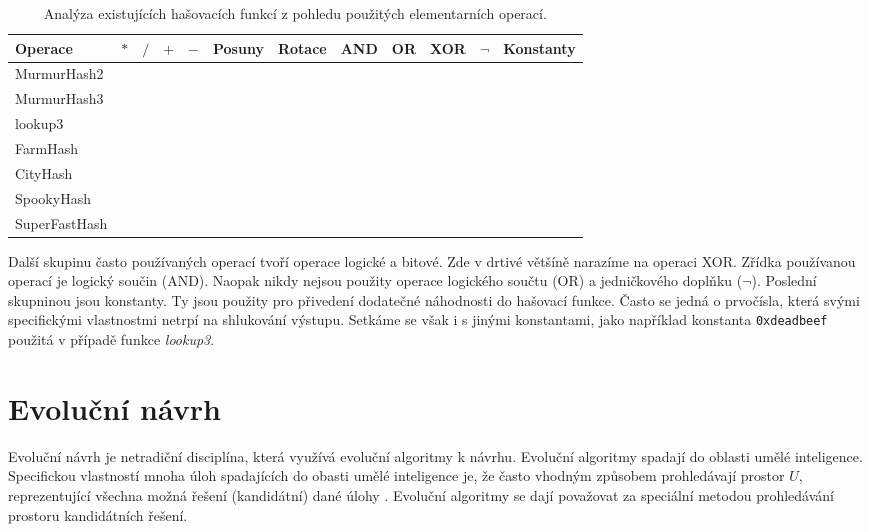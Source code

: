 \begin{table}[!ht]
	\centering
	\label{tab:generic_hashes_analysis}
	\begin{tabular}{lccccccccccc}
		\hline
		Operace            & $*$ & $/$ & $+$ & $-$ & Posuny & Rotace & AND & OR & XOR & $\neg$ & Konstanty \\
		\hline
		MurmurHash2   & \checkmark & & & & \checkmark & & & & \checkmark & & \checkmark \\
		MurmurHash3   & \checkmark & & \checkmark & &  & \checkmark & & & \checkmark & & \checkmark \\
		lookup3              & & & \checkmark & \checkmark & & \checkmark & & & \checkmark & & \checkmark \\
		FarmHash         & \checkmark & & \checkmark & & \checkmark & \checkmark & \checkmark & & \checkmark & & \checkmark  \\
		CityHash          & \checkmark & & \checkmark & & \checkmark & \checkmark & & & \checkmark & & \checkmark \\
		SpookyHash     & & & \checkmark & & & \checkmark & & & \checkmark & & \\
		SuperFastHash & & & \checkmark & & \checkmark & & & & \checkmark & & \\
		\hline		
	\end{tabular}
	\caption{Analýza existujících hašovacích funkcí z pohledu použitých elementarních operací.}
\end{table}

Další skupinu často používaných operací tvoří operace logické a bitové. Zde v drtivé většíně narazíme na operaci XOR. Zřídka
používanou operací je logický součin (AND). Naopak nikdy nejsou použity operace logického součtu (OR) a jedničkového
doplňku ($\neg$). Poslední skupninou jsou konstanty. Ty jsou použity pro přivedení dodatečné náhodnosti do hašovací funkce.
Často se jedná o prvočísla, která svými specifickými vlastnostmi netrpí na shlukování výstupu. Setkáme se však i s jinými 
konstantami, jako například konstanta \texttt{0xdeadbeef} použitá v případě funkce \textit{lookup3}.

\chapter{Evoluční návrh}
\label{sec:evolution_design}

Evoluční návrh je netradiční disciplína, která využívá evoluční algoritmy
k návrhu. Evoluční algoritmy spadají do oblasti umělé 
inteligence. Specifickou vlastností mnoha úloh spadajících do obasti umělé 
inteligence je, že často vhodným způsobem prohledávají prostor $U$,
reprezentující všechna možná řešení (kandidátní) dané úlohy 
\cite{evolution_hardware}. Evoluční algoritmy se dají považovat za speciální metodou 
prohledávání prostoru kandidátních řešení.

